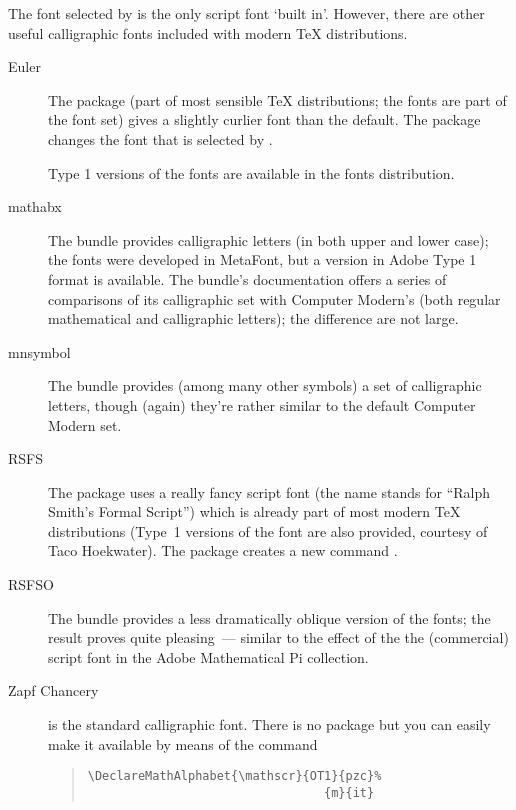 
The font selected by  is the only script font `built
in'. However, there are other useful calligraphic fonts included with
modern \TeX{} distributions.
\begin{description}
\item[Euler] The  package (part of most sensible \TeX{}
  distributions; the fonts are part of the  font set) gives
  a slightly curlier font than the default. The package changes the
  font that is selected by .
  
  Type 1 versions of the fonts are available in the  fonts
  distribution.
\item[mathabx] The  bundle provides calligraphic
  letters (in both upper and lower case); the fonts were developed in
  MetaFont, but a version in Adobe Type 1 format is available.  The
  bundle's documentation offers a series of comparisons of its
  calligraphic set with Computer Modern's (both regular mathematical
  and calligraphic letters); the difference are not large.
\item[mnsymbol] The  bundle provides (among many
  other symbols) a set of calligraphic letters, though (again) they're
  rather similar to the default Computer Modern set.
\item[RSFS] The  package uses a really fancy script
  font (the name stands for ``Ralph Smith's Formal Script'') which is
  already part of most modern \TeX{} distributions (Type~1 versions of
  the font are also provided, courtesy of Taco Hoekwater).  The package
  creates a new command .
\item[RSFSO] The bundle  provides a less dramatically
  oblique version of the  fonts; the result proves quite
  pleasing~--- similar to the effect of the the (commercial) script
  font in the Adobe Mathematical Pi collection.
\item[Zapf Chancery] is the standard \PS{} calligraphic font.  There
  is no package but you can easily make it available by means of the
  command
\begin{quote}
\begin{narrowversion}
\begin{verbatim}
\DeclareMathAlphabet{\mathscr}{OT1}{pzc}%
                                 {m}{it}
\end{verbatim}
\end{narrowversion}

\end{quote}
\end{description}

